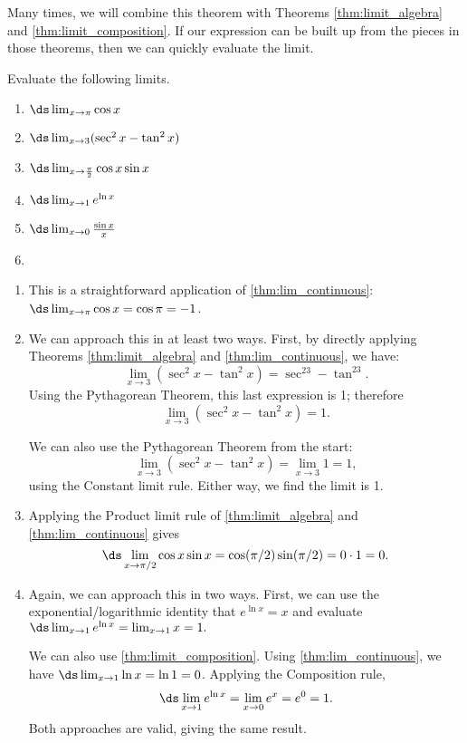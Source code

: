 Many times, we will combine this theorem with Theorems \ref{thm:limit_algebra} and \ref{thm:limit_composition}.  If our expression can be built up from the pieces in those theorems, then we can quickly evaluate the limit.

\begin{example}\label{ex_limit_1}
Evaluate the following limits.
\begin{multicols}{2}
\begin{enumerate}
\item		$\ds \lim_{x\to \pi} \cos x$
\item		$\ds \lim_{x\to 3} (\sec^2x - \tan^2 x)$
\item		$\ds \lim_{x\to \frac\pi2} \cos x\sin x$
\item		$\ds \lim_{x\to 1} e^{\ln x}$
\item		$\ds \lim_{x\to 0} \frac{\sin x}{x}$
\item[]
\end{enumerate}
\end{multicols}
\solution
\begin{enumerate}
	\item	This is a straightforward application of \autoref{thm:lim_continuous}:\\
	 $\ds \lim_{x\to \pi} \cos x = \cos \pi = -1$.
	\item	We can approach this in at least two ways. First, by directly applying Theorems \ref{thm:limit_algebra} and \ref{thm:lim_continuous}, we have:
	\[\lim_{x\to 3} (\sec^2x - \tan^2 x) = \sec^23-\tan^23.\]
	Using the Pythagorean Theorem, this last expression is 1; therefore
	\[\lim_{x\to 3} (\sec^2x - \tan^2 x) = 1.\]

	We can also use the Pythagorean Theorem from the start:
	\[\lim_{x\to 3} (\sec^2x - \tan^2 x) = \lim_{x\to 3} 1 = 1,\]
	using the Constant limit rule. Either way, we find the limit is 1.
	
	\item	Applying the Product limit rule of \autoref{thm:limit_algebra} and \autoref{thm:lim_continuous} gives
	\[\ds \lim_{x\to \pi/2} \cos x\sin x = \cos (\pi/2)\sin(\pi/2) = 0\cdot 1 = 0.\]

	\item	Again, we can approach this in two ways. First, we can use the exponential/logarithmic identity that $e^{\ln x} = x$ and evaluate $\ds \lim_{x\to 1} e^{\ln x} = \lim_{x\to 1} x = 1.$ 

	We can also use \autoref{thm:limit_composition}. Using \autoref{thm:lim_continuous}, we have $\ds \lim_{x\to 1}\ln x = \ln 1 = 0$. Applying the Composition rule,
	\[\ds \lim_{x\to 1} e^{\ln x} = \lim_{x\to 0} e^x = e^0 = 1.\]
	Both approaches are valid, giving the same result.
		

\end{enumerate}
\end{example}
